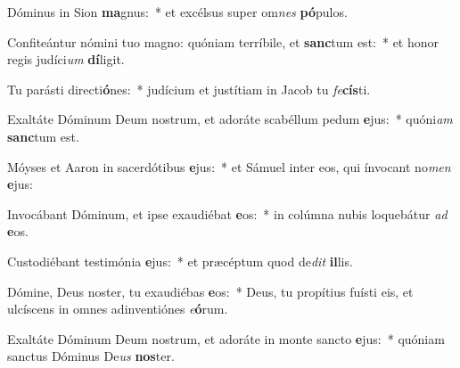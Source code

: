 \item Dóminus in Sion \textbf{ma}gnus:~* et excélsus super om\textit{nes} \textbf{pó}pulos.
\item Confiteántur nómini tuo magno: quóniam terríbile, et \textbf{sanc}tum est:~* et honor regis judíci\textit{um} \textbf{dí}ligit.
\item Tu parásti directi\textbf{ó}nes:~* judícium et justítiam in Jacob tu \textit{fe}\textbf{cís}ti.
\item Exaltáte Dóminum Deum nostrum, et adoráte scabéllum pedum \textbf{e}jus:~* quóni\textit{am} \textbf{sanc}tum est.
\item Móyses et Aaron in sacerdótibus \textbf{e}jus:~* et Sámuel inter eos, qui ínvocant no\textit{men} \textbf{e}jus:
\item Invocábant Dóminum, et ipse exaudiébat \textbf{e}os:~* in colúmna nubis loquebátur \textit{ad} \textbf{e}os.
\item Custodiébant testimónia \textbf{e}jus:~* et præcéptum quod de\textit{dit} \textbf{il}lis.
\item Dómine, Deus noster, tu exaudiébas \textbf{e}os:~* Deus, tu propítius fuísti eis, et ulcíscens in omnes adinventiónes \textit{e}\textbf{ó}rum.
\item Exaltáte Dóminum Deum nostrum, et adoráte in monte sancto \textbf{e}jus:~* quóniam sanctus Dóminus De\textit{us} \textbf{nos}ter.
